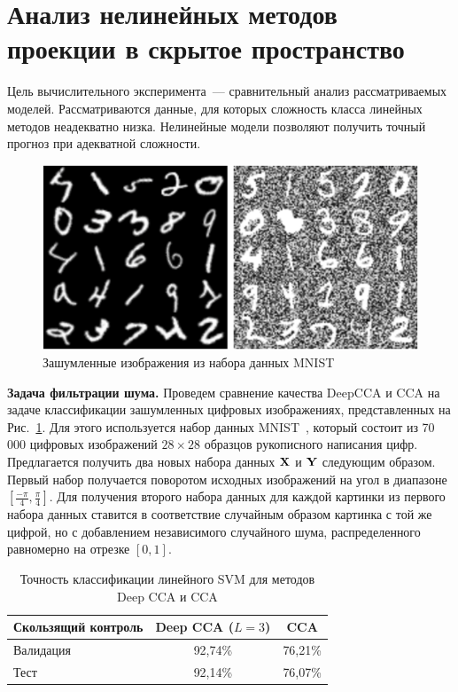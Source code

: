 \section{Анализ нелинейных методов проекции в скрытое пространство}
\label{sec:ch2:exp_nonlinear}

Цель вычислительного эксперимента~--- сравнительный анализ рассматриваемых моделей.
Рассматриваются данные, для которых сложность класса линейных методов неадекватно низка.
Нелинейные модели позволяют получить точный прогноз при адекватной сложности.

\begin{figure}[ht]
	\centering 
	\includegraphics[width=\linewidth]{figs/ch2/noisy_mnist}
	\caption{Зашумленные изображения из набора данных MNIST}
	\label{ch2:fig:noisy_mnist}
\end{figure}

\textbf{Задача фильтрации шума.}
Проведем сравнение качества DeepCCA и CCA на задаче классификации зашумленных цифровых изображениях, представленных на Рис.~\ref{ch2:fig:noisy_mnist}. Для этого используется набор данных MNIST~\cite{MNIST}, который состоит из 70\,000 цифровых изображений $28 \times 28$ образцов рукописного написания цифр. Предлагается получить два новых набора данных $\mathbf{X}$ и $\mathbf{Y}$ следующим образом. Первый набор получается поворотом исходных изображений на угол в диапазоне $[\frac{-\pi}{4}, \frac{\pi}{4}]$. Для получения второго набора данных для каждой картинки из первого набора данных ставится в соответствие случайным образом картинка с той же цифрой, но с добавлением независимого случайного шума, распределенного равномерно на отрезке $[0,1]$.

\begin{table}[ht]
	\caption{Точность классификации линейного SVM для методов Deep CCA и CCA}
	\centering
	\begin{tabular}{l|cc}
	\hline
		Скользящий контроль & Deep CCA ($L=3$) & CCA \\  \hline
		Валидация & 92,74\%  &  76,21\%\\
		Тест & 92,14\% & 76,07\% \\
		\hline
	\end{tabular}
	\label{ch2:tbl:svm_cca}
\end{table}

